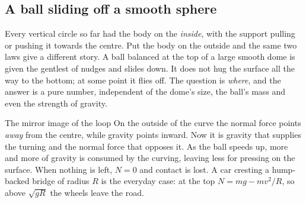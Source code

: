 \subsection{A ball sliding off a smooth sphere}\label{sub:sphere}
Every vertical circle so far had the body on the \emph{inside}, with the support pulling or pushing it
towards the centre. Put the body on the outside and the same two laws give a different story. A ball balanced at the top of a large smooth dome is given the gentlest of nudges and slides down. It
does not hug the surface all the way to the bottom; at some point it flies off. The question is
\emph{where}, and the answer is a pure number, independent of the dome's size, the ball's mass and even
the strength of gravity.

\begin{motivbox}{The mirror image of the loop}
On the outside of the curve the normal force points \emph{away} from the centre, while gravity points
inward. Now it is gravity that supplies the turning and the
normal force that opposes it. As the ball speeds up, more and more of gravity is consumed by the
curving, leaving less for pressing on the surface. When nothing is left, $N=0$ and contact is lost.
A car cresting a hump-backed bridge of radius $R$ is the everyday case: at the top $N=mg-mv^{2}/R$, so
above $\sqrt{gR}$ the wheels leave the road.
\end{motivbox}

\begin{figure}[htbp]
\centering
{}
\end{figure}

